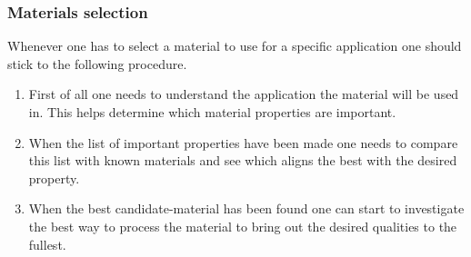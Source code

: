 \subsubsection{Materials selection}
Whenever one has to select a material to use for a specific application one should stick to the following procedure.
\begin{enumerate}
  \item First of all one needs to understand the application the material will be used in. This helps determine which material properties are important.
  \item When the list of important properties have been made one needs to compare this list with known materials and see which aligns the best with the desired property.
  \item When the best candidate-material has been found one can start to investigate the best way to process the material to bring out the desired qualities to the fullest. 
\end{enumerate}
